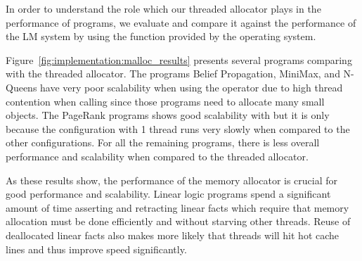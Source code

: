 In order to understand the role which our threaded allocator plays in the
performance of programs, we evaluate and compare it against the performance of
the LM system by using the  function provided by the operating
system.

Figure~\ref{fig:implementation:malloc_results} presents several programs
comparing  with the threaded allocator. The programs Belief
Propagation, MiniMax, and N-Queens have very poor scalability when using the
 operator due to high thread contention when calling 
since those programs need to allocate many small objects. The PageRank programs
shows good scalability with  but it is only because the
configuration with 1 thread runs very slowly when compared to the other
configurations. For all the remaining programs, there is less overall
performance and scalability when compared to the threaded allocator.

As these results show, the performance of the memory allocator is crucial for
good performance and scalability. Linear logic programs spend a significant
amount of time asserting and retracting linear facts which require that memory
allocation must be done efficiently and without starving other threads. Reuse of
deallocated linear facts also makes more likely that threads will hit hot cache
lines and thus improve speed significantly.

\newcommand{\smallplotsize}[0]{0.3}


